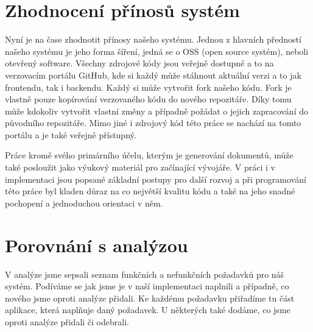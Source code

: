 \section{Zhodnocení přínosů systém}

Nyní je na čase zhodnotit přínosy našeho systému. Jednou z hlavních předností našeho systému je jeho
forma šíření, jedná se o OSS (open source systém), neboli otevřený software. Všechny zdrojové kódy
jsou veřejně dostupné a to na verzovacím portálu GitHub, kde si každý může stáhnout aktuální
verzi a to jak frontendu, tak i backendu. Každý si může vytvořit fork našeho kódu. Fork je vlastně
pouze kopírování verzovaného kódu do nového repozitáře. Díky tomu může kdokoliv vytvořit vlastní změny
a případně požádat o jejich zapracování do původního repozitáře. Mimo jiné i zdrojový kód této práce
se nachází na tomto portálu a je také veřejně přístupný.

Práce kromě svého primárního účelu, kterým je generování dokumentů, může také posloužit jako výukový materiál
pro začínající vývojáře. V práci i v implementaci jsou popsané základní postupy pro další rozvoj a při programování
této práce byl kladen důraz na co největší kvalitu kódu a také na jeho snadné pochopení a jednoduchou orientaci v něm.

\section{Porovnání s analýzou}

V analýze jsme sepsali seznam funkčních a nefunkčních požadavků pro náš systém. Podíváme se
jak jsme je v naší implementaci naplnili a případně, co nového jsme oproti analýze přidali. Ke každému požadavku
přiřadíme tu část aplikace, která naplňuje daný požadavek. U některých také dodáme, co jsme oproti analýze
přidali či odebrali.

